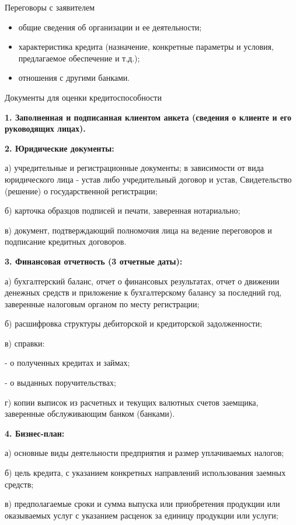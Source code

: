 \documentclass[_Banking_p2.tex]{subfiles}
\begin{document}
\begin{frame}{Переговоры с заявителем}
\begin{itemize}
	\item общие сведения об организации и ее деятельности;
	\item характеристика кредита (назначение, конкретные параметры и условия, предлагаемое обеспечение и т.д.);
	\item отношения с другими банками.
\end{itemize}
\end{frame}

\begin{frame}[allowframebreaks]{Документы для оценки кредитоспособности}

\textbf{1. Заполненная и подписанная клиентом
анкета (сведения о клиенте и его руководящих лицах).}

\textbf{2. Юридические документы:}

а) учредительные и регистрационные
документы; в зависимости от вида юридического лица - устав либо учредительный договор и устав, Свидетельство (решение) о государственной
регистрации;

б) карточка образцов подписей и печати, заверенная нотариально;

\pagebreak
в) документ, подтверждающий полномочия
лица на ведение переговоров и подписание
кредитных договоров.


\textbf{3. Финансовая отчетность (3 отчетные даты):}

а) бухгалтерский баланс, отчет о финансовых результатах, отчет о движении денежных средств и приложение к бухгалтерскому балансу за последний год, заверенные налоговым органом по месту регистрации;

\pagebreak
б) расшифровка структуры дебиторской и кредиторской задолженности;

в) справки:

- о полученных кредитах и займах;

- о выданных поручительствах;

г) копии выписок из расчетных и текущих валютных счетов заемщика, заверенные обслуживающим банком (банками).

\pagebreak
\textbf{4. Бизнес-план:}

а) основные виды деятельности предприятия и размер уплачиваемых налогов;

б) цель кредита, с указанием конкретных направлений использования заемных средств;

в) предполагаемые сроки и сумма выпуска или приобретения продукции или оказываемых услуг с указанием расценок за единицу продукции или услуги;


\end{frame}
\end{document}
